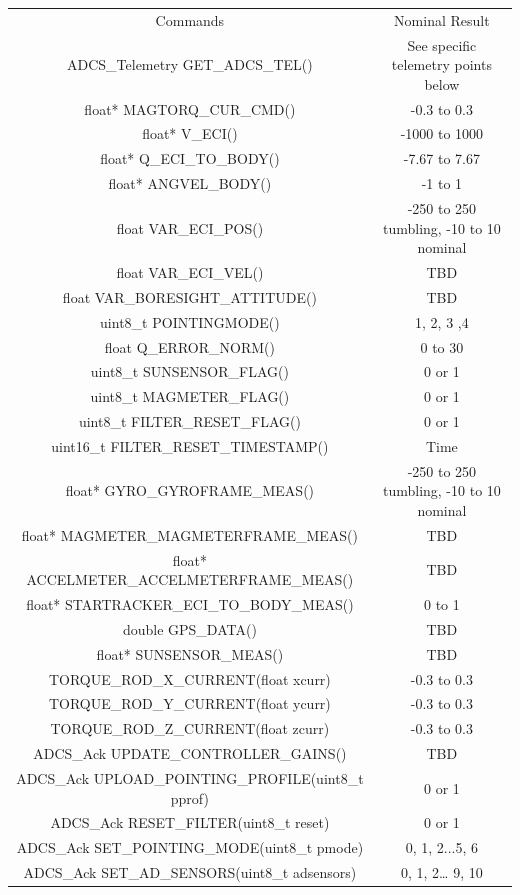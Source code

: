\documentclass{article}
\begin{document}
\begin{tabular}{|c|c|}
	\hline
	Commands      &  Nominal Result                \\ \hhline{|=|=|}
	ADCS_Telemetry GET_ADCS_TEL() & See specific telemetry points below \\ \hline
	float* MAGTORQ_CUR_CMD() & -0.3 to 0.3 \\ \hline
	float* V_ECI() & -1000 to 1000 \\ \hline
	float* Q_ECI_TO_BODY() & -7.67 to 7.67 \\ \hline
	float* ANGVEL_BODY() & -1 to 1 \\ \hline
	float VAR_ECI_POS() & -250 to 250 tumbling, -10 to 10 nominal \\ \hline
	float VAR_ECI_VEL() & TBD \\ \hline
	float VAR_BORESIGHT_ATTITUDE() & TBD \\ \hline
	uint8_t POINTINGMODE() & 1, 2, 3 ,4 \\ \hline
	float Q_ERROR_NORM() & 0 to 30 \\ \hline
	uint8_t SUNSENSOR_FLAG() & 0 or 1 \\ \hline
	uint8_t MAGMETER_FLAG() & 0 or 1  \\ \hline
	uint8_t FILTER_RESET_FLAG() & 0 or 1 \\ \hline
	uint16_t FILTER_RESET_TIMESTAMP() & Time \\ \hline
	float* GYRO_GYROFRAME_MEAS() & -250 to 250 tumbling, -10 to 10 nominal \\ \hline
	float* MAGMETER_MAGMETERFRAME_MEAS() & TBD \\ \hline
	float* ACCELMETER_ACCELMETERFRAME_MEAS() & TBD \\ \hline
	float* STARTRACKER_ECI_TO_BODY_MEAS() & 0 to 1 \\ \hline
	double GPS_DATA() & TBD \\ \hline
	float* SUNSENSOR_MEAS() & TBD \\ \hline
	TORQUE_ROD_X_CURRENT(float xcurr) & -0.3 to 0.3 \\ \hline
	TORQUE_ROD_Y_CURRENT(float ycurr) & -0.3 to 0.3 \\ \hline
	TORQUE_ROD_Z_CURRENT(float zcurr)  & -0.3 to 0.3 \\ \hline
	ADCS_Ack UPDATE_CONTROLLER_GAINS() & TBD \\ \hline
	ADCS_Ack UPLOAD_POINTING_PROFILE(uint8_t pprof) & 0 or 1 \\ \hline
	ADCS_Ack RESET_FILTER(uint8_t reset) & 0 or 1 \\ \hline
	ADCS_Ack SET_POINTING_MODE(uint8_t pmode) & 0, 1, 2...5, 6 \\ \hline
	ADCS_Ack SET_AD_SENSORS(uint8_t adsensors) & 0, 1, 2… 9, 10 \\ \hline
\end{tabular} 
\end{document}
